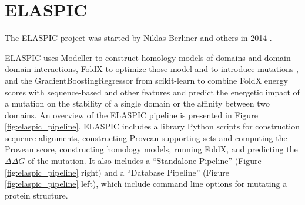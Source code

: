 \clearpage
\section{ELASPIC}

The ELASPIC project was started by Niklas Berliner and others in 2014 \cite{berliner_combining_2014}.

ELASPIC uses Modeller \cite{webb_comparative_2002} to construct homology models of domains and domain-domain interactions, FoldX to optimize those model and to introduce mutations \cite{schymkowitz_foldx_2005}, and the GradientBoostingRegressor from scikit-learn \cite{scikit-learn} to combine FoldX energy scores with sequence-based and other features and predict the energetic impact of a mutation on the stability of a single domain or the affinity between two domains. An overview of the ELASPIC pipeline is presented in Figure \ref{fig:elaspic_pipeline}. ELASPIC includes a library Python scripts for construction sequence alignments, constructing Provean supporting sets and computing the Provean score, constructing homology models, running FoldX, and predicting the $\Delta \Delta G$ of the mutation. It also includes a ``Standalone Pipeline'' (Figure \ref{fig:elaspic_pipeline} right) and a ``Database Pipeline'' (Figure \ref{fig:elaspic_pipeline} left), which include command line options for mutating a protein structure.

